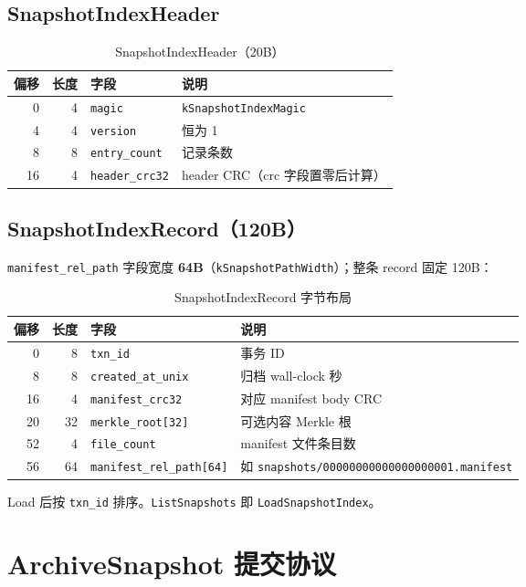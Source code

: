 \subsection{SnapshotIndexHeader}

\begin{longtable}{@{}rrll@{}}
\caption{SnapshotIndexHeader（20B）} \\
\toprule
偏移 & 长度 & 字段 & 说明 \\
\midrule
0 & 4 & \texttt{magic} & \texttt{kSnapshotIndexMagic} \\
4 & 4 & \texttt{version} & 恒为 1 \\
8 & 8 & \texttt{entry\_count} & 记录条数 \\
16 & 4 & \texttt{header\_crc32} & header CRC（crc 字段置零后计算） \\
\bottomrule
\end{longtable}

\subsection{SnapshotIndexRecord（120B）}

\texttt{manifest\_rel\_path} 字段宽度 \textbf{64B}（\texttt{kSnapshotPathWidth}）；整条 record 固定 120B：

\begin{longtable}{@{}rrlp{5.5cm}@{}}
\caption{SnapshotIndexRecord 字节布局} \\
\toprule
偏移 & 长度 & 字段 & 说明 \\
\midrule
0 & 8 & \texttt{txn\_id} & 事务 ID \\
8 & 8 & \texttt{created\_at\_unix} & 归档 wall-clock 秒 \\
16 & 4 & \texttt{manifest\_crc32} & 对应 manifest body CRC \\
20 & 32 & \texttt{merkle\_root[32]} & 可选内容 Merkle 根 \\
52 & 4 & \texttt{file\_count} & manifest 文件条目数 \\
56 & 64 & \texttt{manifest\_rel\_path[64]} & 如 \texttt{snapshots/00000000000000000001.manifest} \\
\bottomrule
\end{longtable}

Load 后按 \texttt{txn\_id} 排序。\texttt{ListSnapshots} 即 \texttt{LoadSnapshotIndex}。

\section{ArchiveSnapshot 提交协议}

